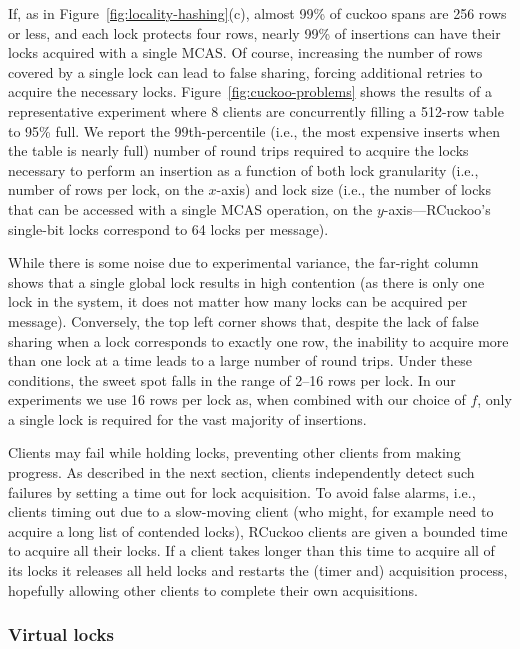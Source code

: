 If, as in Figure~\ref{fig:locality-hashing}(c), almost 99\% of cuckoo
spans are 256 rows or less, and each lock protects four rows, nearly
99\% of insertions can have their locks acquired with a single MCAS.
Of course, increasing the number of rows covered by a single lock can
lead to false sharing, forcing additional retries to acquire the
necessary locks.
%
Figure~\ref{fig:cuckoo-problems} shows the results of a
representative experiment where 8 clients are concurrently
filling a 512-row table to 95\% full.  We report the
99th-percentile (i.e., the most expensive inserts when the
table is nearly full) number of round trips required to
acquire the locks necessary to perform an insertion as a
function of both lock granularity (i.e., number of rows per
lock, on the $x$-axis) and lock size (i.e., the number of
locks that can be accessed with a single MCAS operation, on
the $y$-axis---RCuckoo's single-bit locks correspond to 64
locks per message).

While there is some noise due to experimental variance, the far-right
column shows that a single global lock results in high contention (as
there is only one lock in the system, it does not matter how many
locks can be acquired per message).  Conversely, the top left corner shows
that, despite the lack of false sharing when a lock corresponds to
exactly one row, the inability to acquire more than one lock at a time
leads to a large number of round trips.  Under these conditions, the
sweet spot falls in the range of 2--16 rows per lock.  In our
experiments we use 16 rows per lock as, when combined with our choice of
$f$, only a single lock is required for the vast majority of insertions.

%
Clients may fail while holding locks, preventing other clients from
making progress.  As described in the next section, clients
independently detect such failures by setting a time out for lock
acquisition. To avoid false alarms, i.e., clients timing out due to a
slow-moving client (who might, for example need to acquire a long list
of contended locks), RCuckoo clients are given a bounded time to
acquire all their locks. If a client takes longer than this time to
acquire all of its locks it releases all held locks and restarts the
(timer and) acquisition process, hopefully allowing other clients to
complete their own acquisitions.


\subsubsection{Virtual locks}

